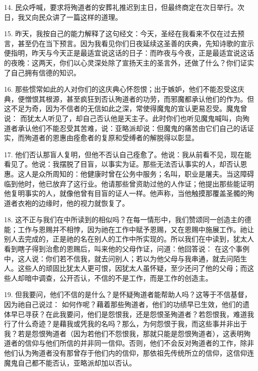 14. 民众呼喊，要求将殉道者的安葬礼推迟到主日，但最终商定在次日举行。次日，我又向民众讲了一篇这样的道理。\par

15. 昨天，我按自己的能力解释了这句经文：今天，圣经在我看来不仅在过去预言，甚至仍在当下预言。因为我看见你们日夜延续这圣善的庆典，先知诗歌的宣示便指明，昨天与今天正是最适宜说这话的日子：而昨夜与今夜，正是最适宜说这话的夜晚：这两天，你们以心灵深处除了宣扬天主的圣言外，还做了什么？你们证实了自己拥有信德的知识。\par

16. 那些惯常如此的人对你们的这庆典心怀怨恨；出于嫉妒，他们不能忍受这庆典，便憎恨其根源，甚至疯狂到否认殉道者的功劳，而邪魔都承认他们的作为。但这不足为奇，因为不信者的无信如此之深，常使得魔鬼的宣认更易忍受。魔鬼曾说： 而犹太人听见了，却自己否认他是天主子。此时你们也听见魔鬼喊叫，向殉道者承认他们不能忍受其苦难，说：亚略派却说：但魔鬼的痛苦由它们自己的话证实，而殉道者的恩惠由痊愈者的复原和受缚者的解脱得以彰显。\par

17. 他们否认那盲人复明，但他不否认自己痊愈了。他说：我从前看不见，现在能看见了。他说：我摆脱了目盲，以事实为证。那些无法否认事实的人，却否认恩惠。这人是众所周知的：他健康时曾在公务中服务；名叫，职业是屠夫。当这障碍临到他时，他已放弃了这行业。他请那些曾资助过他的人作证；他提出那些能证明他复明事实的人，就像他曾有目盲的证人一样。他声称，当他触摸那覆盖圣髑的殉道者衣袍的边缘时，他的视力就恢复了。\par

18. 这不正与我们在中所读到的相似吗？在每一情形中，我们赞颂同一创造主的德能；工作与恩赐并不相悖，因为祂在工作中赋予恩赐，又在恩赐中施展工作。祂让别人去完成的，正是祂的名在别人的工作中所实现的。所以我们在中读到，犹太人看到瞎子得到治愈的恩赐后，叫来他的父母作证，问道：他回答说： 在这个事例中，这人说：你们若不信我，就去问别人；若以为他父母与我串通，就去问陌生人。这些人的顽固比犹太人更可恨，因犹太人虽怀疑，至少还问了他的父母；而这些人却暗中调查，公开否认，不信的不是工作，而是工作的创造主。\par

19. 但我要问，他们不信的是什么？是怀疑殉道者能帮助人吗？这等于不信基督，因为祂自己说过： 如何作呢？藉着那些殉道者，他们的功绩早已生效，他们的遗体早已寻获？在此我要问，他们是怨恨我，还是怨恨圣殉道者？若怨恨我，难道我行了什么奇迹？是藉我或凭我的名吗？那么，为何怨恨于我，而这些事并非出于我？若是怨恨殉道者（因为若他们不怨恨我，那就只能是怨恨殉道者），这表明殉道者的信仰与他们所信的并非同一信仰。否则，他们不会反对殉道者的工作，除非他们认为殉道者没有那曾存于他们内的信仰，那依祖先传统所立的信仰，这信仰连魔鬼自己都不能否认，亚略派却加以否认。\par

